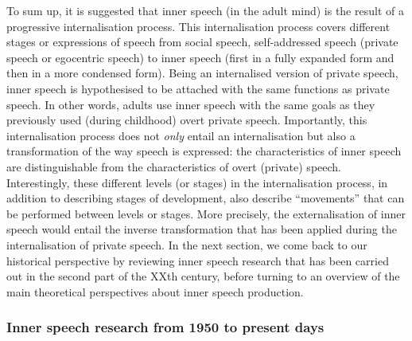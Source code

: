 \documentclass[a4paper,12pt,twoside,onecolumn,openright,final,oldfontcommands]{memoir}
\begin{document}
To sum up, it is suggested that inner speech (in the adult mind) is the result of a progressive internalisation process. This internalisation process covers different stages or expressions of speech from social speech, self-addressed speech (private speech or egocentric speech) to inner speech (first in a fully expanded form and then in a more condensed form). Being an internalised version of private speech, inner speech is hypothesised to be attached with the same functions as private speech. In other words, adults use inner speech with the same goals as they previously used (during childhood) overt private speech. Importantly, this internalisation process does not \emph{only} entail an internalisation but also a transformation of the way speech is expressed: the characteristics of inner speech are distinguishable from the characteristics of overt (private) speech. Interestingly, these different levels (or stages) in the internalisation process, in addition to describing stages of development, also describe \enquote{movements} that can be performed between levels or stages. More precisely, the externalisation of inner speech would entail the inverse transformation that has been applied during the internalisation of private speech. In the next section, we come back to our historical perspective by reviewing inner speech research that has been carried out in the second part of the XXth century, before turning to an overview of the main theoretical perspectives about inner speech production.

\hypertarget{inner-speech-research-from-1950-to-present-days}{%
\subsubsection{Inner speech research from 1950 to present days}\label{inner-speech-research-from-1950-to-present-days}}
\end{document}
